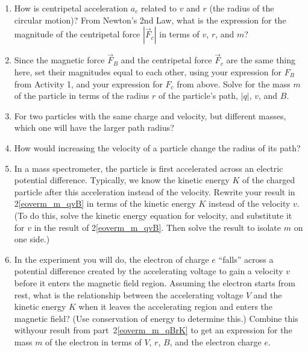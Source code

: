 \begin{enumerate}[labparts]


\item How is centripetal acceleration $a_c$ related to $v$ and $r$ (the radius of the
circular motion)? From Newton's 2nd Law, what is the expression for the magnitude of the centripetal force $|\vec F_c|$ in terms of $v$, $r$, and $m$?
\answerspace{15mm}


\item Since the magnetic force $\vec F_B$ and the centripetal force $\vec F_c$ are the same thing here, set their magnitudes equal to each other, using your expression for $F_B$ from Activity 1, and your expression for $F_c$ from above.  
Solve for the mass $m$ of the particle in terms of the radius $r$ of the particle's path,
$|q|$, $v$, and $B$. \label{eoverm_m_qvB}
\answerspace{35mm}


\item For two particles with the same charge and velocity, but different masses, which one will have the larger path radius?
\answerspace{0.5in}

\item How would increasing the velocity of a particle change the radius of its path?  \label{eoverm_predict_radius}
\answerspace{0.5in}

\item In a mass spectrometer, the particle is first accelerated
across an electric potential difference. Typically, we know the kinetic 
energy $K$ of the charged particle after this acceleration instead of the 
velocity. Rewrite your result in 2\ref{eoverm_m_qvB} in terms of the kinetic energy $K$ 
instead of the velocity $v$. (To do this, solve the kinetic energy equation for velocity, 
and substitute it for $v$ in the result of 2\ref{eoverm_m_qvB}. Then solve the result to isolate $m$ on one side.) \label{eoverm_m_qBrK}
\answerspace{30mm}

\item In the experiment you will do, the electron of charge $e$ ``falls'' across a potential difference created by the 
accelerating voltage to gain a velocity $v$ before it enters the magnetic 
field region. Assuming the electron starts from rest, what is the relationship 
between the accelerating voltage $V$ and the kinetic energy $K$ when it leaves the 
accelerating region and enters the magnetic field? (Use conservation of energy 
to determine this.) Combine this withyour result from part~2\ref{eoverm_m_qBrK} to get an 
expression for the mass $m$ of the electron in terms of
$V$, $r$, $B$, and the electron charge $e$. \label{eoverm_m_eBrV}
\answerspace{50mm}


\end{enumerate}
